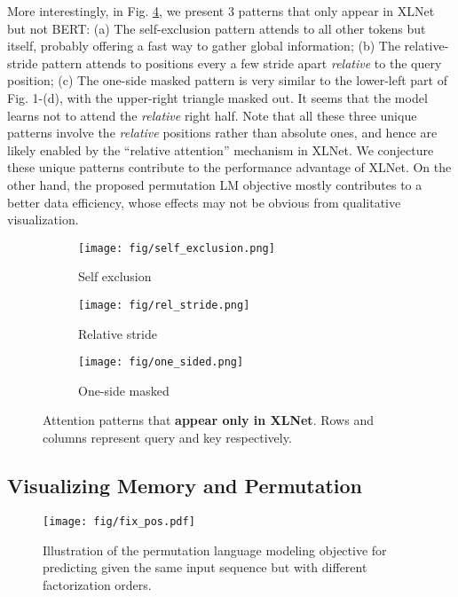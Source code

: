 \documentclass{article}
\begin{document}
More interestingly, in Fig. \ref{fig:xlnet_unique}, we present 3 patterns that only appear in XLNet but not BERT:
(a) The self-exclusion pattern attends to all other tokens but itself, probably offering a fast way to gather global information; (b) The relative-stride pattern attends to positions every a few stride apart \textit{relative} to the query position; (c) The one-side masked pattern is very similar to the lower-left part of Fig. 1-(d), with the upper-right triangle masked out. It seems that the model learns not to attend the \textit{relative} right half. 
Note that all these three unique patterns involve the \textit{relative} positions rather than absolute ones, and hence are likely enabled by the ``relative attention'' mechanism in XLNet. 
We conjecture these unique patterns contribute to the performance advantage of XLNet.
On the other hand, the proposed permutation LM objective mostly contributes to a better data efficiency, whose effects may not be obvious from qualitative visualization.
\begin{figure}[!h]
  \vspace{-1em}
  \centering
  \begin{subfigure}[b]{0.22\textwidth}
    \centering
    \texttt{[image: fig/self\_exclusion.png]}
    \caption{\footnotesize Self exclusion}
    \label{fig:self_exclusion}
    \vspace{-0.3em}
  \end{subfigure}
  \hfill
  \begin{subfigure}[b]{0.22\textwidth}
    \centering
    \texttt{[image: fig/rel\_stride.png]}
    \caption{\footnotesize Relative stride}
    \label{fig:rel_stride}
    \vspace{-0.3em}
  \end{subfigure}
  \hfill
  \begin{subfigure}[b]{0.22\textwidth}
    \centering
    \texttt{[image: fig/one\_sided.png]}
    \caption{\footnotesize One-side masked}
    \label{fig:one_sided}
    \vspace{-0.3em}
  \end{subfigure}
  \caption{\footnotesize Attention patterns that \textbf{appear only in XLNet}. Rows and columns represent query and key respectively.}
  \label{fig:xlnet_unique}
  \vspace{-1.5em}
\end{figure}


\subsection{Visualizing Memory and Permutation}
\label{sec:vis}
\begin{figure}[!h]
	\centering
	\texttt{[image: fig/fix\_pos.pdf]}
	\caption{Illustration of the permutation language modeling objective for predicting  given the same input sequence  but with different factorization orders.}
	\label{fig:obj_overview}
\end{figure}
\end{document}

